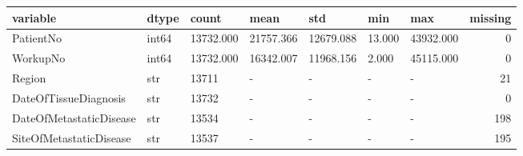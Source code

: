\begin{tabular}{lllllllr}
\toprule
variable & dtype & count & mean & std & min & max & missing \\
\midrule
PatientNo & int64 & 13732.000 & 21757.366 & 12679.088 & 13.000 & 43932.000 & 0 \\
WorkupNo & int64 & 13732.000 & 16342.007 & 11968.156 & 2.000 & 45115.000 & 0 \\
Region & str & 13711 & - & - & - & - & 21 \\
DateOfTissueDiagnosis & str & 13732 & - & - & - & - & 0 \\
DateOfMetastaticDisease & str & 13534 & - & - & - & - & 198 \\
SiteOfMetastaticDisease & str & 13537 & - & - & - & - & 195 \\
\bottomrule
\end{tabular}
